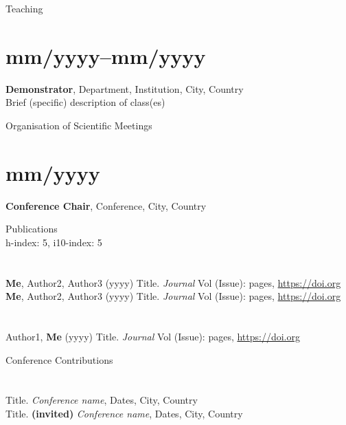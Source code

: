 \documentclass[margin,line,10pt]{res}
\begin{document}
\begin{resume}
\vspace*{-.2in}

{\sc Teaching}\\
\vspace*{-.35in}
\section{\sc mm/yyyy--mm/yyyy}{\bf Demonstrator}, Department, Institution, City, Country\\
Brief (specific) description of class(es)\\

\vspace*{-.2in}

{\sc Organisation of Scientific Meetings}\\
\vspace*{-.35in}
\section{\sc mm/yyyy}{\bf Conference Chair}, Conference, City, Country\\

\vspace*{-.2in}

{\sc Publications}\\
h-index: 5, i10-index: 5\\
\vspace*{-.35in}
\section{}
{\bf Me}, Author2, Author3 (yyyy) Title. \textit{Journal} Vol (Issue): pages, \url{https://doi.org}\\
{\bf Me}, Author2, Author3 (yyyy) Title. \textit{Journal} Vol (Issue): pages, \url{https://doi.org}\\      
\vspace*{-.35in}
\section{}
Author1, {\bf Me} (yyyy) Title. \textit{Journal} Vol (Issue): pages, \url{https://doi.org}\\

\vspace*{-.2in}

{\sc Conference Contributions}\\
\vspace*{-.35in}
\section{}
Title. \textit{Conference name}, Dates, City, Country\\
Title. {\bf (invited)} \textit{Conference name}, Dates, City, Country\\   
\vspace*{-.35in}

\end{resume}
\end{document}
